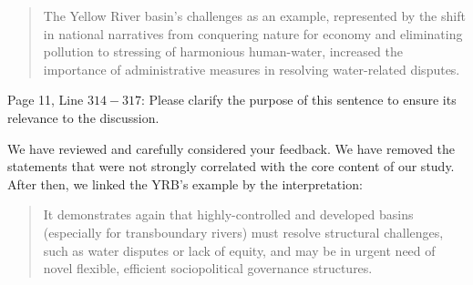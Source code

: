 \begin{quote}
	The Yellow River basin's challenges as an example, represented by the shift in national narratives from conquering nature for economy and eliminating pollution to stressing of harmonious human-water, increased the importance of administrative measures in resolving water-related disputes.
\end{quote}

\RC{} Page 11, Line $314-317$: Please clarify the purpose of this sentence to ensure its relevance to the discussion.

\AR{} We have reviewed and carefully considered your feedback. We have removed the statements that were not strongly correlated with the core content of our study. After then, we linked the YRB's example by the interpretation:

\begin{quote}
	It demonstrates again that highly-controlled and developed basins (especially for transboundary rivers) must resolve structural challenges, such as water disputes or lack of equity, and may be in urgent need of novel flexible, efficient sociopolitical governance structures.
\end{quote}
